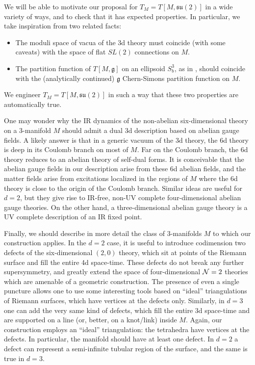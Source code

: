 \documentclass[hyper,letterpaper]{JHEP3}
\numberwithin{equation}{section}
\begin{document}
We will be able to motivate our proposal for $T_M = T[M,\mathfrak{su}(2)]$ in a wide variety of ways,
and to check that it has expected properties.
In particular, we take inspiration from two related facts:
\begin{itemize}
\item The moduli space of vacua
of the 3d theory must coincide (with some caveats) with the space of flat $SL(2)$ connections on $M$.
\item The partition function of $T[M,\mathfrak{g}]$ on an ellipsoid $S^3_b$, as in \cite{HHL},
should coincide with the (analytically continued) $\mathfrak{g}$ Chern-Simons partition function on $M$.
\end{itemize}
We engineer $T_M = T[M,\mathfrak{su}(2)]$ in such a way that these two properties are automatically true.

One may wonder why the IR dynamics of the non-abelian six-dimensional theory on
a 3-manifold $M$ should admit a dual 3d description based on abelian gauge fields.
A likely answer is that in a generic vacuum of the 3d theory, the 6d theory is deep in its Coulomb branch on most of $M$.
Far on the Coulomb branch, the 6d theory reduces to an abelian theory of self-dual forms.
It is conceivable that the abelian gauge fields in our description arise from these 6d abelian fields,
and the matter fields arise from excitations localized in the regions of $M$ where the 6d theory is close to the origin of the Coulomb branch.
Similar ideas are useful for $d=2$, but they give rise to IR-free, non-UV complete four-dimensional abelian gauge theories.
On the other hand, a three-dimensional abelian gauge theory is a UV complete description of an IR fixed point.

Finally, we should describe in more detail the class of 3-manifolds $M$ to which our construction applies.
In the $d=2$ case, it is useful to introduce codimension two defects of the six-dimensional $(2,0)$ theory,
which sit at points of the Riemann surface and fill the entire 4d space-time.
These defects do not break any further supersymmetry, and greatly extend the space of
four-dimensional ${\cal N}=2$ theories which are amenable of a geometric construction.
The presence of even a single puncture allows one to use some interesting tools based
on ``ideal'' triangulations of Riemann surfaces, which have vertices at the defects only.
Similarly, in $d=3$ one can add the very same kind of defects, which fill the entire 3d space-time
and are supported on a line (or, better, on a knot/link) inside $M$.
Again, our construction employs an ``ideal'' triangulation: the tetrahedra have vertices at the defects.
In particular, the manifold should have at least one defect.
In $d=2$ a defect can represent a semi-infinite tubular region of the surface, and the same is true in $d=3$.
\end{document}

